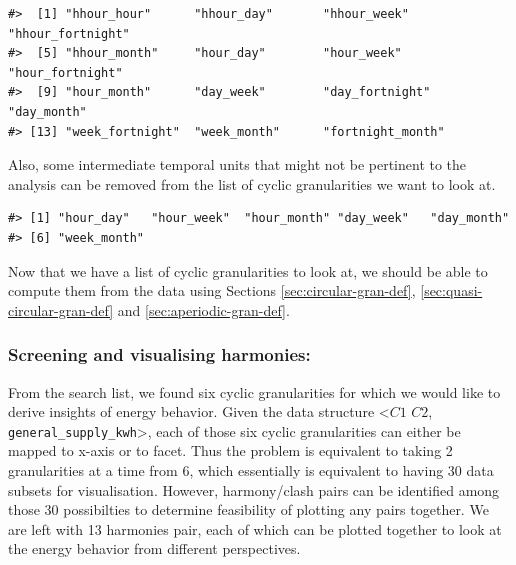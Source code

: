 \documentclass[12pt]{article}
\newenvironment{Shaded}{\begin{snugshade}}{\end{snugshade}}
\newcommand{\DataTypeTok}[1]{\textcolor[rgb]{0.13,0.29,0.53}{#1}}
\newcommand{\KeywordTok}[1]{\textcolor[rgb]{0.13,0.29,0.53}{\textbf{#1}}}
\newcommand{\NormalTok}[1]{#1}
\newcommand{\OperatorTok}[1]{\textcolor[rgb]{0.81,0.36,0.00}{\textbf{#1}}}
\newcommand{\StringTok}[1]{\textcolor[rgb]{0.31,0.60,0.02}{#1}}
\begin{document}
\begin{verbatim}
#>  [1] "hhour_hour"      "hhour_day"       "hhour_week"      "hhour_fortnight"
#>  [5] "hhour_month"     "hour_day"        "hour_week"       "hour_fortnight" 
#>  [9] "hour_month"      "day_week"        "day_fortnight"   "day_month"      
#> [13] "week_fortnight"  "week_month"      "fortnight_month"
\end{verbatim}

Also, some intermediate temporal units that might not be pertinent to the analysis can be removed from the list of cyclic granularities we want to look at.

\begin{Shaded}
\end{Shaded}

\begin{verbatim}
#> [1] "hour_day"   "hour_week"  "hour_month" "day_week"   "day_month" 
#> [6] "week_month"
\end{verbatim}

Now that we have a list of cyclic granularities to look at, we should be able to compute them from the data using Sections \ref{sec:circular-gran-def}, \ref{sec:quasi-circular-gran-def} and \ref{sec:aperiodic-gran-def}.

\hypertarget{screening-and-visualising-harmonies}{%
\subsubsection{Screening and visualising harmonies:}\label{screening-and-visualising-harmonies}}

From the search list, we found six cyclic granularities for which we would like to derive insights of energy behavior. Given the data structure \textless{}\(C1\) \(C2\), \texttt{general\_supply\_kwh}\textgreater{}, each of those six cyclic granularities can either be mapped to x-axis or to facet. Thus the problem is equivalent to taking 2 granularities at a time from 6, which essentially is equivalent to having 30 data subsets for visualisation. However, harmony/clash pairs can be identified among those 30 possibilties to determine feasibility of plotting any pairs together. We are left with 13 harmonies pair, each of which can be plotted together to look at the energy behavior from different perspectives.
\end{document}

